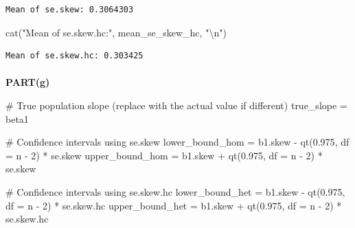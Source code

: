 \documentclass[
  11pt,
]{article}
\makeatletter
\let\oldparagraph\paragraph
\renewcommand{\paragraph}{
    \@ifstar
      \xxxParagraphStar
      \xxxParagraphNoStar
  }
\newcommand{\xxxParagraphStar}[1]{\oldparagraph*{#1}\mbox{}}
\newcommand{\xxxParagraphNoStar}[1]{\oldparagraph{#1}\mbox{}}
\newenvironment{Shaded}{\begin{snugshade}}{\end{snugshade}}
\newcommand{\AttributeTok}[1]{\textcolor[rgb]{0.40,0.45,0.13}{#1}}
\newcommand{\CommentTok}[1]{\textcolor[rgb]{0.37,0.37,0.37}{#1}}
\newcommand{\DecValTok}[1]{\textcolor[rgb]{0.68,0.00,0.00}{#1}}
\newcommand{\FloatTok}[1]{\textcolor[rgb]{0.68,0.00,0.00}{#1}}
\newcommand{\FunctionTok}[1]{\textcolor[rgb]{0.28,0.35,0.67}{#1}}
\newcommand{\NormalTok}[1]{\textcolor[rgb]{0.00,0.23,0.31}{#1}}
\newcommand{\OtherTok}[1]{\textcolor[rgb]{0.00,0.23,0.31}{#1}}
\newcommand{\SpecialCharTok}[1]{\textcolor[rgb]{0.37,0.37,0.37}{#1}}
\newcommand{\StringTok}[1]{\textcolor[rgb]{0.13,0.47,0.30}{#1}}
\makeatother
\begin{document}
\begin{verbatim}
Mean of se.skew: 0.3064303 
\end{verbatim}

\begin{Shaded}
\begin{Highlighting}[]
\FunctionTok{cat}\NormalTok{(}\StringTok{"Mean of se.skew.hc:"}\NormalTok{, mean\_se\_skew\_hc, }\StringTok{"}\SpecialCharTok{\textbackslash{}n}\StringTok{"}\NormalTok{)}
\end{Highlighting}
\end{Shaded}

\begin{verbatim}
Mean of se.skew.hc: 0.303425 
\end{verbatim}

\paragraph{\texorpdfstring{\textbf{PART(g)}}{PART(g)}}\label{partg}

\begin{Shaded}
\begin{Highlighting}[]
\CommentTok{\# True population slope (replace with the actual value if different)}
\NormalTok{true\_slope }\OtherTok{=}\NormalTok{ beta1}

\CommentTok{\# Confidence intervals using se.skew}
\NormalTok{lower\_bound\_hom }\OtherTok{=}\NormalTok{ b1.skew }\SpecialCharTok{{-}} \FunctionTok{qt}\NormalTok{(}\FloatTok{0.975}\NormalTok{, }\AttributeTok{df =}\NormalTok{ n }\SpecialCharTok{{-}} \DecValTok{2}\NormalTok{) }\SpecialCharTok{*}\NormalTok{ se.skew}
\NormalTok{upper\_bound\_hom }\OtherTok{=}\NormalTok{ b1.skew }\SpecialCharTok{+} \FunctionTok{qt}\NormalTok{(}\FloatTok{0.975}\NormalTok{, }\AttributeTok{df =}\NormalTok{ n }\SpecialCharTok{{-}} \DecValTok{2}\NormalTok{) }\SpecialCharTok{*}\NormalTok{ se.skew}

\CommentTok{\# Confidence intervals using se.skew.hc}
\NormalTok{lower\_bound\_het }\OtherTok{=}\NormalTok{ b1.skew }\SpecialCharTok{{-}} \FunctionTok{qt}\NormalTok{(}\FloatTok{0.975}\NormalTok{, }\AttributeTok{df =}\NormalTok{ n }\SpecialCharTok{{-}} \DecValTok{2}\NormalTok{) }\SpecialCharTok{*}\NormalTok{ se.skew.hc}
\NormalTok{upper\_bound\_het }\OtherTok{=}\NormalTok{ b1.skew }\SpecialCharTok{+} \FunctionTok{qt}\NormalTok{(}\FloatTok{0.975}\NormalTok{, }\AttributeTok{df =}\NormalTok{ n }\SpecialCharTok{{-}} \DecValTok{2}\NormalTok{) }\SpecialCharTok{*}\NormalTok{ se.skew.hc}
\end{Highlighting}
\end{Shaded}
\end{document}

